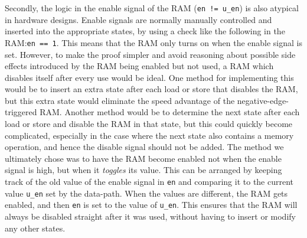 Secondly, the logic in the enable signal of the RAM (\texttt{en != u\_en}) is also atypical in hardware designs.  Enable signals are normally manually controlled and inserted into the appropriate states, by using a check like the following in the RAM:\@ \texttt{en == 1}.  This means that the RAM only turns on when the enable signal is set.  However, to make the proof simpler and avoid reasoning about possible side effects introduced by the RAM being enabled but not used, a RAM which disables itself after every use would be ideal.  One method for implementing this would be to insert an extra state after each load or store that disables the RAM, but this extra state would eliminate the speed advantage of the negative-edge-triggered RAM. Another method would be to determine the next state after each load or store and disable the RAM in that state, but this could quickly become complicated, especially in the case where the next state also contains a memory operation, and hence the disable signal should not be added. The method we ultimately chose was to have the RAM become enabled not when the enable signal is high, but when it \emph{toggles} its value.  This can be arranged by keeping track of the old value of the enable signal in \texttt{en} and comparing it to the current value \texttt{u\_en} set by the data-path.  When the values are different, the RAM gets enabled, and then \texttt{en} is set to the value of \texttt{u\_en}. This ensures that the RAM will always be disabled straight after it was used, without having to insert or modify any other states.


